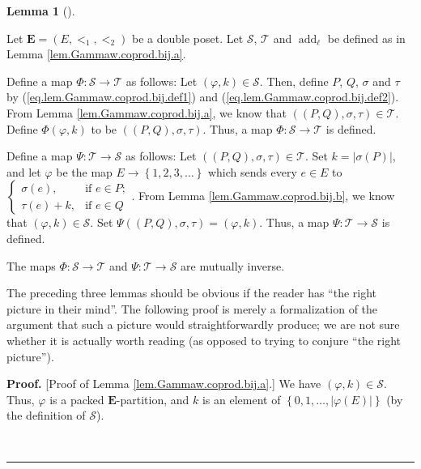 \documentclass[numbers=enddot,12pt,final,onecolumn,notitlepage,abstracton]{scrartcl}
\theoremstyle{definition}
\newtheorem{lem}[theo]{Lemma}
\newenvironment{lemma}[1][]
{\begin{lem}[#1]\begin{leftbar}}
{\end{leftbar}\end{lem}}
\newenvironment{proof}[1][Proof]{\noindent\textbf{#1.} }{\ \rule{0.5em}{0.5em}}
\newenvironment{verlong}{}{}
\newcommand{\EE}{{\mathbf{E}}}
\begin{document}
\begin{verlong}
\begin{lemma}
\label{lem.Gammaw.coprod.bij}
Let $\EE = \left(  E,<_{1},<_{2}\right)  $
be a double poset. Let $\mathcal{S}$, $\mathcal{T}$ and
$\operatorname{add}_{\ell}$ be defined as in
Lemma \ref{lem.Gammaw.coprod.bij.a}.

Define a map $\Phi:\mathcal{S}\rightarrow\mathcal{T}$ as follows: Let $\left(
\varphi,k\right)  \in\mathcal{S}$. Then, define $P$, $Q$, $\sigma$ and $\tau$
by (\ref{eq.lem.Gammaw.coprod.bij.def1}) and
(\ref{eq.lem.Gammaw.coprod.bij.def2}). From Lemma
\ref{lem.Gammaw.coprod.bij.a}, we know that $\left(  \left(  P,Q\right)
,\sigma,\tau\right)  \in\mathcal{T}$. Define $\Phi\left(  \varphi,k\right)  $
to be $\left(  \left(  P,Q\right)  ,\sigma,\tau\right)  $. Thus, a map
$\Phi:\mathcal{S}\rightarrow\mathcal{T}$ is defined.

Define a map $\Psi:\mathcal{T}\rightarrow\mathcal{S}$ as follows: Let $\left(
\left(  P,Q\right)  ,\sigma,\tau\right)  \in\mathcal{T}$. Set $k=\left\vert
\sigma\left(  P\right)  \right\vert $, and let $\varphi$ be the map
$E\rightarrow\left\{  1,2,3,\ldots\right\}  $ which sends every $e\in E$ to $%
\begin{cases}
\sigma\left(  e\right)  , & \text{if }e\in P;\\
\tau\left(  e\right)  +k, & \text{if }e\in Q
\end{cases}
$. From Lemma \ref{lem.Gammaw.coprod.bij.b}, we know that $\left(
\varphi,k\right)  \in\mathcal{S}$. Set $\Psi\left(  \left(  P,Q\right)
,\sigma,\tau\right)  =\left(  \varphi,k\right)  $. Thus, a map $\Psi
:\mathcal{T}\rightarrow\mathcal{S}$ is defined.

The maps $\Phi : \mathcal{S} \rightarrow \mathcal{T}$ and
$\Psi : \mathcal{T} \rightarrow \mathcal{S}$ are mutually inverse.
\end{lemma}

The preceding three lemmas should be obvious if the reader has
\textquotedblleft the right picture in their mind\textquotedblright. The
following proof is merely a formalization of the argument that such a picture
would straightforwardly produce; we are not sure whether it is actually worth
reading (as opposed to trying to conjure \textquotedblleft the right
picture\textquotedblright).

\begin{proof}
[Proof of Lemma \ref{lem.Gammaw.coprod.bij.a}.]
We have $\left(  \varphi ,k\right)  \in\mathcal{S}$. Thus,
$\varphi$ is a packed $\EE$-partition, and $k$ is an element
of $\left\{  0,1,\ldots,\left\vert
\varphi\left(  E\right)  \right\vert \right\}  $ (by the definition of
$\mathcal{S}$).


\end{proof}
\end{verlong}
\end{document}

